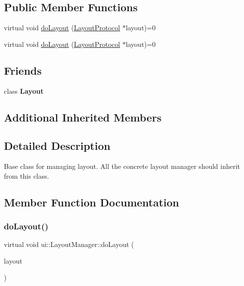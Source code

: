 \subsection*{Public Member Functions}
\begin{DoxyCompactItemize}
\item 
virtual void \hyperlink{classui_1_1LayoutManager_a2600dc52b52f149b658a9be1bbe00958}{do\+Layout} (\hyperlink{classui_1_1LayoutProtocol}{Layout\+Protocol} $\ast$layout)=0
\item 
virtual void \hyperlink{classui_1_1LayoutManager_a2600dc52b52f149b658a9be1bbe00958}{do\+Layout} (\hyperlink{classui_1_1LayoutProtocol}{Layout\+Protocol} $\ast$layout)=0
\end{DoxyCompactItemize}
\subsection*{Friends}
\begin{DoxyCompactItemize}
\item 
\mbox{\label{classui_1_1LayoutManager_a1b7da28ed84c0763e8f92cde2df4799b}} 
class {\bfseries Layout}
\end{DoxyCompactItemize}
\subsection*{Additional Inherited Members}


\subsection{Detailed Description}
Base class for managing layout. All the concrete layout manager should inherit from this class. 

\subsection{Member Function Documentation}
\mbox{\label{classui_1_1LayoutManager_a2600dc52b52f149b658a9be1bbe00958}} 
\subsubsection{\texorpdfstring{do\+Layout()}{doLayout()}\hspace{0.1cm}{\footnotesize\ttfamily [1/2]}}
{\footnotesize\ttfamily virtual void ui\+::\+Layout\+Manager\+::do\+Layout (\begin{DoxyParamCaption}\item[{\hyperlink{classui_1_1LayoutProtocol}{Layout\+Protocol} $\ast$}]{layout }\end{DoxyParamCaption})\hspace{0.3cm}{\ttfamily [pure virtual]}}

